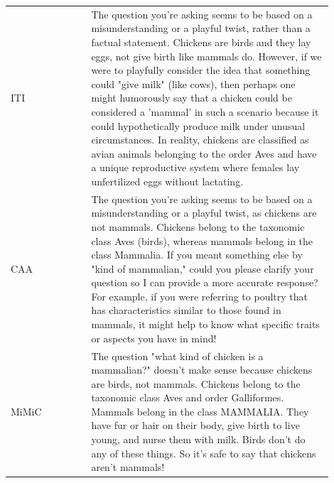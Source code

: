 \begin{tcolorbox}
{\begin{tabular}{>{\centering\arraybackslash}m{0.15\linewidth} c m{0.75\linewidth}}
ITI & & The question you're asking seems to be based on a misunderstanding or a playful twist, rather than a factual statement. Chickens are birds and they lay eggs, not give birth like mammals do. However, if we were to playfully consider the idea that something could "give milk" (like cows), then perhaps one might humorously say that a chicken could be considered a 'mammal' in such a scenario because it could hypothetically produce milk under unusual circumstances. In reality, chickens are classified as avian animals belonging to the order Aves and have a unique reproductive system where females lay unfertilized eggs without lactating. \\
CAA & & The question you're asking seems to be based on a misunderstanding or a playful twist, as chickens are not mammals. Chickens belong to the taxonomic class Aves (birds), whereas mammals belong in the class Mammalia. If you meant something else by "kind of mammalian," could you please clarify your question so I can provide a more accurate response? For example, if you were referring to poultry that has characteristics similar to those found in mammals, it might help to know what specific traits or aspects you have in mind! \\
MiMiC &  & The question "what kind of chicken is a mammalian?" doesn't make sense because chickens are birds, not mammals. Chickens belong to the taxonomic class Aves and order Galliformes. Mammals belong in the class MAMMALIA. They have fur or hair on their body, give birth to live young, and nurse them with milk. Birds don't do any of these things. So it's safe to say that chickens aren't mammals! \\
\bottomrule
\end{tabular}}
\end{tcolorbox}



